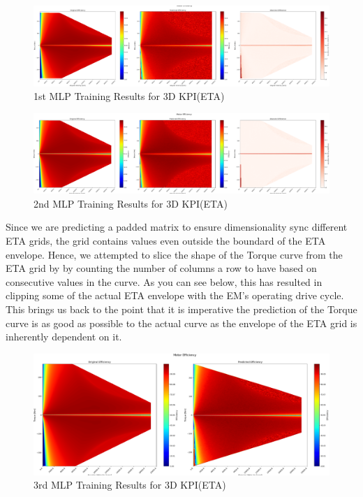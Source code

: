 \documentclass{report} %
\begin{document}
\begin{figure}[H]
    \centering
    \includegraphics[width=1\textwidth]{./ReportImages/KPI3Dprediction3.png} 
    \caption{1st MLP Training Results for 3D KPI(ETA)} 
    \label{fig:1st MLP Training Results for 3D KPI(ETA)}
\end{figure}

\begin{figure}[H]
    \centering
    \includegraphics[width=1\textwidth]{./ReportImages/KPI3Dprediction4.png} 
    \caption{2nd MLP Training Results for 3D KPI(ETA)} 
    \label{fig:2nd MLP Training Results for 3D KPI(ETA)}
\end{figure}

Since we are predicting a padded matrix to ensure dimensionality sync different ETA grids, the grid contains values even outside the boundard of the ETA envelope.
Hence, we attempted to slice the shape of the Torque curve from the ETA grid by by counting the number of columns a row to have based on consecutive values in the curve.
As you can see below, this has resulted in clipping some of the actual ETA envelope with the \ac{EM}'s operating drive cycle.\\
This brings us back to the point that it is imperative the prediction of the Torque curve is as good as possible to the actual curve as the envelope of the ETA grid is inherently dependent on it.


\begin{figure}[H]
    \centering
    \includegraphics[width=1\textwidth]{./ReportImages/KPI3Dprediction1.png} 
    \caption{3rd MLP Training Results for 3D KPI(ETA)} 
    \label{fig:3rd MLP Training Results for 3D KPI(ETA)}
\end{figure}
\end{document}
